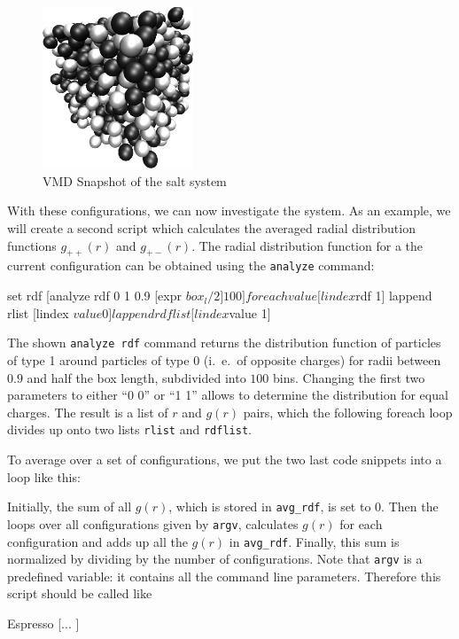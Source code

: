 \begin{figure}[tb]
  \centering
  \includegraphics[width=0.4\textwidth]{figures/salt.png}
  \caption{VMD Snapshot of the salt system}
  \label{fig:snapshot}
\end{figure}

With these configurations, we can now investigate the system. As an example, we
will create a second script which calculates the averaged radial distribution
functions $g_{++}(r)$ and $g_{+-}(r)$. The radial distribution function for a
the current configuration can be obtained using the \verb|analyze| command:
\begin{tclcode}
set rdf [analyze rdf 0 1 0.9 [expr $box_l/2] 100]
foreach value [lindex $rdf 1] {
  lappend rlist   [lindex $value 0]
  lappend rdflist [lindex $value 1] 
}
\end{tclcode}
The shown \verb|analyze rdf| command returns the distribution function of
particles of type 1 around particles of type 0 (i.~e.\ of opposite charges) for
radii between $0.9$ and half the box length, subdivided into $100$ bins.
Changing the first two parameters to either ``0 0'' or ``1 1'' allows to
determine the distribution for equal charges. The result is a list of $r$ and
$g(r)$ pairs, which the following foreach loop divides up onto two lists
\verb|rlist| and \verb|rdflist|.

To average over a set of configurations, we put the two last code snippets into
a loop like this:
Initially, the sum of all $g(r)$, which is stored in \verb|avg_rdf|, is set to
0.  Then the loops over all configurations given by \verb|argv|, calculates
$g(r)$ for each configuration and adds up all the $g(r)$ in \verb|avg_rdf|.
Finally, this sum is normalized by dividing by the number of configurations.
Note that \verb|argv| is a predefined variable: it contains all the command line
parameters. Therefore this script should be called like
\begin{code}
Espresso  [... ]
\end{code}

